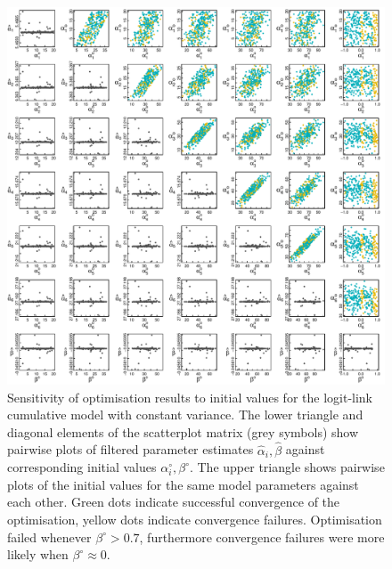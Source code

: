 \begin{figure}[p]
  \centering
  \includegraphics[width=\textwidth]{../figures/figS2_initial_value_sensitivity_logit.pdf}
  \caption{Sensitivity of optimisation results to initial values for the logit-link cumulative model with constant variance. The lower triangle and diagonal elements of the scatterplot matrix (grey symbols) show pairwise plots of filtered parameter estimates $\hat{\alpha}_i, \hat{\beta}$  against corresponding initial values $\alpha^{\circ}_i, \beta^{\circ}$. The upper triangle shows pairwise plots of the initial values for the same model parameters against each other. Green dots indicate successful convergence of the optimisation, yellow dots indicate convergence failures. Optimisation failed whenever $\beta^{\circ}>0.7$, furthermore convergence failures were more likely when $\beta^{\circ}\approx 0$.}
  \label{fig:figS2}
\end{figure} 

